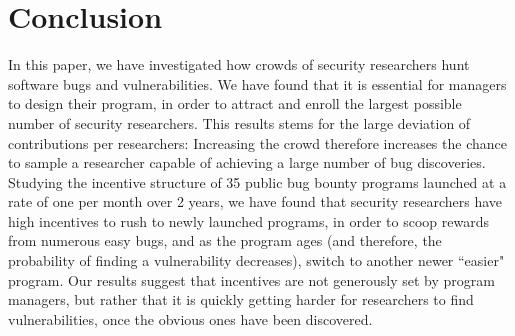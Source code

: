 \section{Conclusion}
\label{sec:conclusion}
In this paper, we have investigated how crowds of security researchers hunt software bugs and vulnerabilities. We have found that it is essential for managers to design their program, in order to attract and enroll the largest possible number of security researchers. This results stems for the large deviation of contributions per researchers: Increasing the crowd therefore increases the chance to sample a researcher capable of achieving a large number of bug discoveries. Studying the incentive structure of 35 public bug bounty programs launched at a rate of one per month over 2 years, we have found that security researchers have high incentives to rush to newly launched programs, in order to scoop rewards from numerous easy bugs, and as the program ages (and therefore, the probability of finding a vulnerability decreases), switch to another newer ``easier" program. Our results suggest that incentives are not generously set by program managers, but rather that it is quickly getting harder for researchers to find vulnerabilities, once the obvious ones have been discovered.